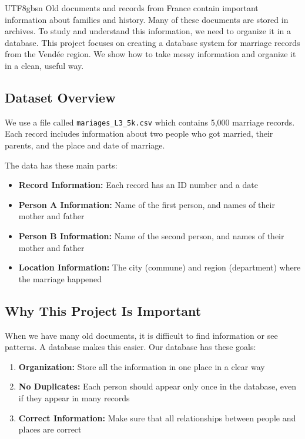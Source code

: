 \documentclass[11pt]{report}
\begin{document}
\begin{CJK*}{UTF8}{gbsn}
    Old documents and records from France contain important information about families and history. Many of these documents are stored in archives. To study and understand this information, we need to organize it in a database. This project focuses on creating a database system for marriage records from the Vendée region. We show how to take messy information and organize it in a clean, useful way.

    \subsection{Dataset Overview}

    We use a file called \texttt{mariages\_L3\_5k.csv} which contains 5,000 marriage records. Each record includes information about two people who got married, their parents, and the place and date of marriage.

    The data has these main parts:

    \begin{itemize}
        \item \textbf{Record Information:} Each record has an ID number and a date
        \item \textbf{Person A Information:} Name of the first person, and names of their mother and father
        \item \textbf{Person B Information:} Name of the second person, and names of their mother and father
        \item \textbf{Location Information:} The city (commune) and region (department) where the marriage happened
    \end{itemize}

    \subsection{Why This Project Is Important}

    When we have many old documents, it is difficult to find information or see patterns. A database makes this easier. Our database has these goals:

    \begin{enumerate}
        \item \textbf{Organization:} Store all the information in one place in a clear way
        \item \textbf{No Duplicates:} Each person should appear only once in the database, even if they appear in many records
        \item \textbf{Correct Information:} Make sure that all relationships between people and places are correct
    \end{enumerate}



\end{CJK*}
\end{document}
